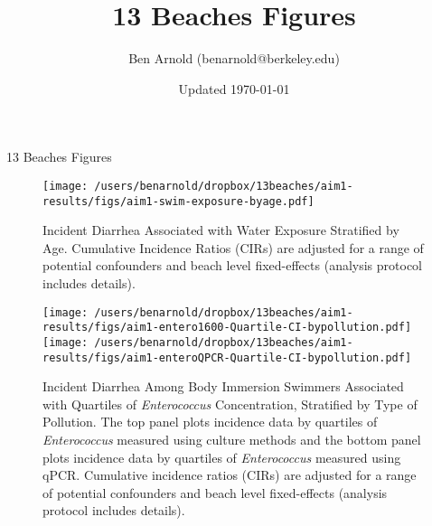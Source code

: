 \documentclass[11pt]{article}
\title{13 Beaches Figures}
\author{Ben Arnold (benarnold@berkeley.edu)}
\date{Updated \today}
\begin{document}
{\centerline {\LARGE 13 Beaches Figures} }


\begin{landscape}
\begin{figure}[htbp]
\begin{center}
\texttt{[image: /users/benarnold/dropbox/13beaches/aim1-results/figs/aim1-swim-exposure-byage.pdf]}
\begin{minipage}{1.2\textwidth}
\caption{Incident Diarrhea Associated with Water Exposure Stratified by Age. Cumulative Incidence Ratios (CIRs) are adjusted for a range of potential confounders and beach level fixed-effects (analysis protocol includes details).}
\label{fig:swimex}
\end{minipage}
\end{center}
\end{figure}
\end{landscape}

\begin{figure}[htbp]
\begin{center}
\texttt{[image: /users/benarnold/dropbox/13beaches/aim1-results/figs/aim1-entero1600-Quartile-CI-bypollution.pdf]} 
\texttt{[image: /users/benarnold/dropbox/13beaches/aim1-results/figs/aim1-enteroQPCR-Quartile-CI-bypollution.pdf]} 
\begin{minipage}{0.9\textwidth}
\caption{Incident Diarrhea Among Body Immersion Swimmers Associated with Quartiles of \textit{Enterococcus} Concentration, Stratified by Type of Pollution. The top panel plots incidence data by quartiles of \textit{Enterococcus} measured using culture methods and the bottom panel plots incidence data by quartiles of \textit{Enterococcus} measured using qPCR.  Cumulative incidence ratios (CIRs) are adjusted for a range of potential confounders and beach level fixed-effects (analysis protocol includes details). }
\label{fig:enteroquartile}
\end{minipage}
\end{center}
\end{figure}
\end{document}
